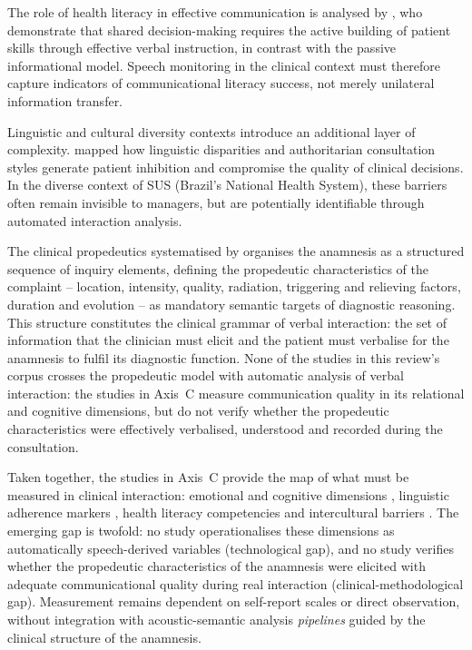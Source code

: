 \documentclass[review,12pt]{elsarticle}
\begin{document}
The role of health literacy in effective communication is analysed by
\citet{Muscat2020}, who demonstrate that shared decision-making requires the
active building of patient skills through effective verbal instruction, in
contrast with the passive informational model. Speech monitoring in the
clinical context must therefore capture indicators of communicational literacy
success, not merely unilateral information transfer.

Linguistic and cultural diversity contexts introduce an additional layer of
complexity. \citet{Alkhamees2023} mapped how linguistic disparities and
authoritarian consultation styles generate patient inhibition and compromise
the quality of clinical decisions. In the diverse context of SUS (Brazil's
National Health System), these barriers often remain invisible to managers,
but are potentially identifiable through automated interaction analysis.

The clinical propedeutics systematised by \citet{Porto2019} organises the
anamnesis as a structured sequence of inquiry elements, defining the
propedeutic characteristics of the complaint -- location, intensity, quality,
radiation, triggering and relieving factors, duration and evolution -- as
mandatory semantic targets of diagnostic reasoning. This structure constitutes
the clinical grammar of verbal interaction: the set of information that the
clinician must elicit and the patient must verbalise for the anamnesis to
fulfil its diagnostic function. None of the studies in this review's corpus
crosses the propedeutic model with automatic analysis of verbal interaction:
the studies in Axis~C measure communication quality in its relational and
cognitive dimensions, but do not verify whether the propedeutic characteristics
were effectively verbalised, understood and recorded during the consultation.

Taken together, the studies in Axis~C provide the map of what must be measured
in clinical interaction: emotional and cognitive dimensions
\citep{Kelley2014,Shao2025}, linguistic adherence markers
\citep{McCabe2018,Rucinski2022}, health literacy competencies
\citep{Muscat2020} and intercultural barriers \citep{Alkhamees2023}. The
emerging gap is twofold: no study operationalises these dimensions as
automatically speech-derived variables (technological gap), and no study
verifies whether the propedeutic characteristics of the anamnesis
\citep{Porto2019} were elicited with adequate communicational quality during
real interaction (clinical-methodological gap). Measurement remains dependent
on self-report scales or direct observation, without integration with
acoustic-semantic analysis \textit{pipelines} guided by the clinical structure
of the anamnesis.
\end{document}
